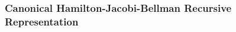 \documentclass[12pt]{article}
\numberwithin{equation}{section} %
\theoremstyle{plain}
\theoremstyle{definition}
\theoremstyle{remark}
\begin{document}


\clearpage
\subsubsection{Canonical Hamilton-Jacobi-Bellman Recursive
Representation}
\end{document}
